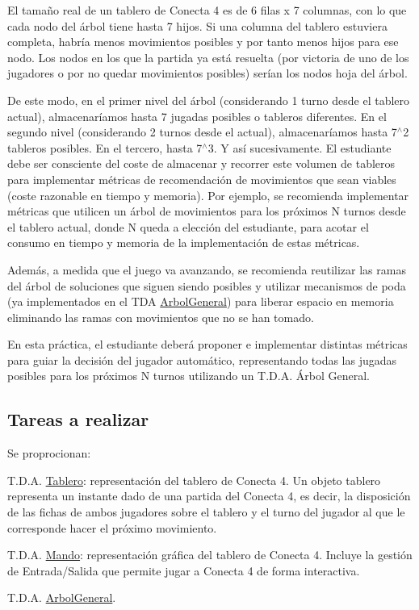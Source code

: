 El tamaño real de un tablero de Conecta 4 es de 6 filas x 7 columnas, con lo que cada nodo del árbol tiene hasta 7 hijos. Si una columna del tablero estuviera completa, habría menos movimientos posibles y por tanto menos hijos para ese nodo. Los nodos en los que la partida ya está resuelta (por victoria de uno de los jugadores o por no quedar movimientos posibles) serían los nodos hoja del árbol.

De este modo, en el primer nivel del árbol (considerando 1 turno desde el tablero actual), almacenaríamos hasta 7 jugadas posibles o tableros diferentes. En el segundo nivel (considerando 2 turnos desde el actual), almacenaríamos hasta 7$^\wedge$2 tableros posibles. En el tercero, hasta 7$^\wedge$3. Y así sucesivamente. El estudiante debe ser consciente del coste de almacenar y recorrer este volumen de tableros para implementar métricas de recomendación de movimientos que sean viables (coste razonable en tiempo y memoria). Por ejemplo, se recomienda implementar métricas que utilicen un árbol de movimientos para los próximos N turnos desde el tablero actual, donde N queda a elección del estudiante, para acotar el consumo en tiempo y memoria de la implementación de estas métricas.

Además, a medida que el juego va avanzando, se recomienda reutilizar las ramas del árbol de soluciones que siguen siendo posibles y utilizar mecanismos de poda (ya implementados en el T\-D\-A \hyperlink{classArbolGeneral}{Arbol\-General}) para liberar espacio en memoria eliminando las ramas con movimientos que no se han tomado.

En esta práctica, el estudiante deberá proponer e implementar distintas métricas para guiar la decisión del jugador automático, representando todas las jugadas posibles para los próximos N turnos utilizando un T.\-D.\-A. Árbol General.\hypertarget{index_tareas}{}\subsection{Tareas a realizar}\label{index_tareas}
Se proprocionan\-:
\begin{DoxyEnumerate}
\item T.\-D.\-A. \hyperlink{classTablero}{Tablero}\-: representación del tablero de Conecta 4. Un objeto tablero representa un instante dado de una partida del Conecta 4, es decir, la disposición de las fichas de ambos jugadores sobre el tablero y el turno del jugador al que le corresponde hacer el próximo movimiento.
\item T.\-D.\-A. \hyperlink{classMando}{Mando}\-: representación gráfica del tablero de Conecta 4. Incluye la gestión de Entrada/\-Salida que permite jugar a Conecta 4 de forma interactiva.
\item T.\-D.\-A. \hyperlink{classArbolGeneral}{Arbol\-General}.
\end{DoxyEnumerate}

